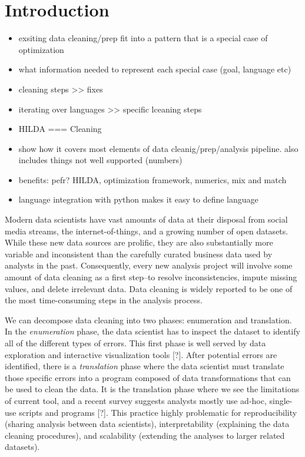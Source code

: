\section{Introduction}\label{intro}\sloppy
\begin{itemize}
  \item exsiting data cleaning/prep fit into a pattern that is a special case of optimization
  \item what information needed to represent each special case (goal, language etc)
  \item cleaning steps >> fixes
  \item iterating over languages >> specific lceaning steps
  \item HILDA === Cleaning
  \item show how it covers most elements of data cleanig/prep/analysis pipeline.  also includes things not well supported (numbers)
  \item benefits: pefr? HILDA, optimization framework, numerics, mix and match
  \item language integration with python makes it easy to define language
\end{itemize}

Modern data scientists have vast amounts of data at their disposal from social media streams, the internet-of-things, and a growing number of open datasets.
While these new data sources are prolific, they are also substantially more variable and inconsistent than the carefully curated business data used by analysts in the past.
Consequently, every new analysis project will involve some amount of data cleaning as a first step--to resolve inconsistencies, impute missing values, and delete irrelevant data.
Data cleaning is widely reported to be one of the most time-consuming steps in the analysis process.

We can decompose data cleaning into two phases: enumeration and translation. 
In the \emph{enumeration} phase, the data scientist has to inspect the dataset to identify all of the different types of errors.
This first phase is well served by data exploration and interactive visualization tools [?].
After potential errors are identified, there is a \emph{translation} phase where the data scientist must translate those specific errors into a program composed of data transformations that can be used to clean the data.
It is the translation phase where we see the limitations of current tool, and a recent survey suggests analysts mostly use ad-hoc, single-use scripts and programs [?]. 
This practice highly problematic for reproducibility (sharing analysis between data scientists), interpretability (explaining the  data cleaning procedures),  and  scalability (extending the analyses to larger related datasets).

